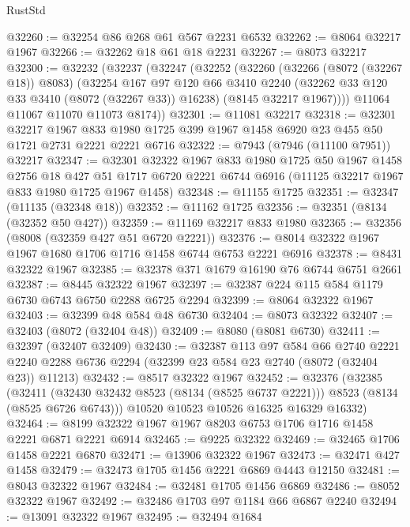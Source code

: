 \begin{lexlean}{RustStd}
\begin{coremodule}
@32260 := @32254 @86 @268 @61 @567 @2231 @6532
@32262 := @8064 @32217 @1967
@32266 := @32262 @18 @61 @18 @2231
@32267 := @8073 @32217
@32300 := @32232
    (@32237
      (@32247
        (@32252
          (@32260
            (@32266 (@8072 (@32267 @18)) @8083)
            (@32254
              @167
              @97
              @120
              @66
              @3410
              @2240
              (@32262 @33 @120 @33 @3410 (@8072 (@32267 @33)) @16238)
              (@8145 @32217 @1967))))
        @11064
        @11067
        @11070
        @11073
        @8174))
@32301 := @11081 @32217
@32318 := @32301
    @32217
    @1967
    @833
    @1980
    @1725
    @399
    @1967
    @1458
    @6920
    @23
    @455
    @50
    @1721
    @2731
    @2221
    @2221
    @6716
@32322 := @7943 (@7946 (@11100 @7951)) @32217
@32347 := @32301
    @32322
    @1967
    @833
    @1980
    @1725
    @50
    @1967
    @1458
    @2756
    @18
    @427
    @51
    @1717
    @6720
    @2221
    @6744
    @6916
    (@11125 @32217 @1967 @833 @1980 @1725 @1967 @1458)
@32348 := @11155 @1725
@32351 := @32347 (@11135 (@32348 @18))
@32352 := @11162 @1725
@32356 := @32351 (@8134 (@32352 @50 @427))
@32359 := @11169 @32217 @833 @1980
@32365 := @32356 (@8008 (@32359 @427 @51 @6720 @2221))
@32376 := @8014 @32322 @1967 @1967 @1680 @1706 @1716 @1458 @6744 @6753 @2221 @6916
@32378 := @8431 @32322 @1967
@32385 := @32378 @371 @1679 @16190 @76 @6744 @6751 @2661
@32387 := @8445 @32322 @1967
@32397 := @32387 @224 @115 @584 @1179 @6730 @6743 @6750 @2288 @6725 @2294
@32399 := @8064 @32322 @1967
@32403 := @32399 @48 @584 @48 @6730
@32404 := @8073 @32322
@32407 := @32403 (@8072 (@32404 @48))
@32409 := @8080 (@8081 @6730)
@32411 := @32397 (@32407 @32409)
@32430 := @32387
    @113
    @97
    @584
    @66
    @2740
    @2221
    @2240
    @2288
    @6736
    @2294
    (@32399 @23 @584 @23 @2740 (@8072 (@32404 @23)) @11213)
@32432 := @8517 @32322 @1967
@32452 := @32376
    (@32385
      (@32411 (@32430 @32432 @8523 (@8134 (@8525 @6737 @2221))) @8523 (@8134 (@8525 @6726 @6743)))
      @10520
      @10523
      @10526
      @16325
      @16329
      @16332)
@32464 := @8199 @32322 @1967 @1967 @8203 @6753 @1706 @1716 @1458 @2221 @6871 @2221 @6914
@32465 := @9225 @32322
@32469 := @32465 @1706 @1458 @2221 @6870
@32471 := @13906 @32322 @1967
@32473 := @32471 @427 @1458
@32479 := @32473 @1705 @1456 @2221 @6869 @4443 @12150
@32481 := @8043 @32322 @1967
@32484 := @32481 @1705 @1456 @6869
@32486 := @8052 @32322 @1967
@32492 := @32486 @1703 @97 @1184 @66 @6867 @2240
@32494 := @13091 @32322 @1967
@32495 := @32494 @1684

\end{coremodule}
\end{lexlean}
